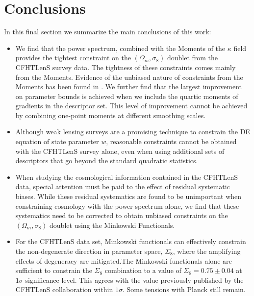 \documentclass[reprint,aps,prd,superscriptaddress,showkeys,showpacs]{revtex4-1}
\begin{document}

\section{Conclusions}

In this final section we summarize the main conclusions of this work:

\begin{itemize}

\item We find that the power spectrum, combined with the Moments of
  the $\kappa$ field provides the tightest constraint on the
  $(\Omega_m,\sigma_8)$ doublet from the CFHTLenS survey data. The
  tightness of these constraints comes mainly from the
  Moments. Evidence of the unbiased nature of constraints from the
  Moments has been found in \citep{PetriSpurious}. We further find
  that the largest improvement on parameter bounds is achieved when we
  include the quartic moments of gradients in the descriptor set. This
  level of improvement cannot be achieved by combining one-point
  moments at different smoothing scales.

\item Although weak lensing surveys are a promising technique to
  constrain the DE equation of state parameter $w$, reasonable
  constraints cannot be obtained with the CFHTLenS survey alone, even
  when using additional sets of descriptors that go beyond the
  standard quadratic statistics.

\item When studying the cosmological information contained in the
  CFHTLenS data, special attention must be paid to the effect of
  residual systematic biases. While these residual systematics are
  found to be unimportant when constraining cosmology with the power
  spectrum alone, we find that these systematics need to be corrected
  to obtain unbiased constraints on the $(\Omega_m,\sigma_8)$ doublet
  using the Minkowski Functionals.

\item For the CFHTLenS data set, Minkowski functionals can effectively
  constrain the non-degenerate direction in parameter space,
  $\Sigma_8$, where the amplifying effects of degeneracy are
  mitigated.The Minkowski functionals alone are sufficient to
  constrain the $\Sigma_8$ combination to a value of
  $\Sigma_8=0.75\pm0.04$ at $1\sigma$ significance level. This agrees
  with the value previously published by the CFHTLenS collaboration
  within $1\sigma$. Some tensions with Planck \citep{PlanckXVI2013}
  still remain.

\end{itemize}
\end{document}
